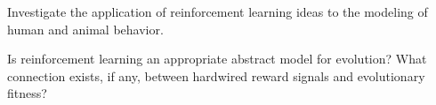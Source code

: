 \begin{iexercise}\libex%
Investigate the application of reinforcement learning ideas to the
modeling of human and animal behavior.
\end{iexercise} 

\begin{uexercise}\libex%
Is reinforcement learning an appropriate abstract model for evolution?
What connection exists, if any, between hardwired reward signals and evolutionary fitness?
\end{uexercise} 



